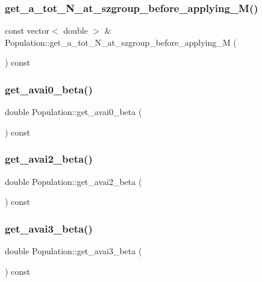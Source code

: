 \subsubsection{\texorpdfstring{get\_a\_tot\_N\_at\_szgroup\_before\_applying\_M()}{get\_a\_tot\_N\_at\_szgroup\_before\_applying\_M()}}
{\footnotesize\ttfamily const vector$<$ double $>$ \& Population\+::get\+\_\+a\+\_\+tot\+\_\+\+N\+\_\+at\+\_\+szgroup\+\_\+before\+\_\+applying\+\_\+M (\begin{DoxyParamCaption}{ }\end{DoxyParamCaption}) const}

\mbox{\label{class_population_a32115ccdce71ca9cf4a7e610d2812af8}} 
\subsubsection{\texorpdfstring{get\_avai0\_beta()}{get\_avai0\_beta()}}
{\footnotesize\ttfamily double Population\+::get\+\_\+avai0\+\_\+beta (\begin{DoxyParamCaption}{ }\end{DoxyParamCaption}) const}

\mbox{\label{class_population_aa5250248f8643d26b3c5c26c1e53413d}} 
\subsubsection{\texorpdfstring{get\_avai2\_beta()}{get\_avai2\_beta()}}
{\footnotesize\ttfamily double Population\+::get\+\_\+avai2\+\_\+beta (\begin{DoxyParamCaption}{ }\end{DoxyParamCaption}) const}

\mbox{\label{class_population_a5e14b47bc170ad8ed99abfa4b59897c1}} 
\subsubsection{\texorpdfstring{get\_avai3\_beta()}{get\_avai3\_beta()}}
{\footnotesize\ttfamily double Population\+::get\+\_\+avai3\+\_\+beta (\begin{DoxyParamCaption}{ }\end{DoxyParamCaption}) const}

